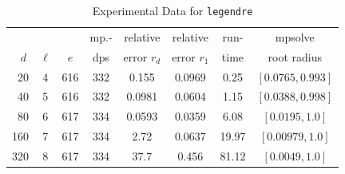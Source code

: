 \documentclass[runningheads]{llncs}
\begin{document}
\begin{table}
\caption{Experimental Data for \texttt{legendre}} %
\label{tab:legendre}
\vskip -0.15in
\begin{center}
\begin{small}
\begin{sc}
\begin{tabular}{rccccccc}
\toprule
&  &  & mp.-& relative  & relative & run- & mpsolve \\
$d~$& $\ell$& $e$ & dps&error $r_d$       & error $r_1$ &time& root radius\\
\midrule
 20 & 4 & 616 & 332 & 0.155 & 0.0969 & 0.25 & $[0.0765, 0.993]$\\
 40 & 5 & 616 & 332 & 0.0981 & 0.0604 & 1.15 & $[0.0388, 0.998]$\\
 80 & 6 & 617 & 334 & 0.0593 & 0.0359 & 6.08 & $[0.0195, 1.0]$\\
  160 & 7 & 617 & 334 & 2.72 & 0.0637 & 19.97 & $[0.00979, 1.0]$\\
 320 & 8 & 617 & 334 & 37.7 & 0.456 & 81.12 & $[0.0049, 1.0]$\\
\bottomrule
\end{tabular}
\end{sc}
\end{small}
\end{center}
\vskip 0.05in
\end{table}
\end{document}
